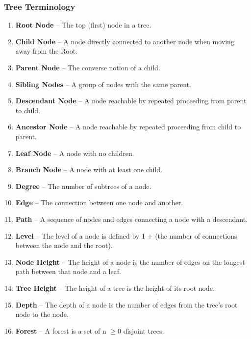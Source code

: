 \documentclass[10pt,a4paper,leqno,bibliography=totoc]{scrartcl}
\newenvironment{alphafootnotes}
{\par\edef\savedfootnotenumber{\number\value{footnote}}
\renewcommand{\thefootnote}{\alph{footnote}}
\setcounter{footnote}{0}}
{\par\setcounter{footnote}{\savedfootnotenumber}}
\begin{document}
\begin{alphafootnotes}
\begin{multicols*}{2}
		\subsubsection{Tree Terminology\supercite{wiki:xxx}}
		\begin{enumerate}[label=\textbf{\alph*})]
			\item \textbf{Root Node} --  The top (first) node in a tree.
			\item \textbf{Child Node} --  A node directly connected to another node when moving away from the Root.
			\item \textbf{Parent Node} --  The converse notion of a child.
			\item \textbf{Sibling Nodes} --  A group of nodes with the same parent.
			\item \textbf{Descendant Node} --  A node reachable by repeated proceeding from parent to child.
			\item \textbf{Ancestor Node} --  A node reachable by repeated proceeding from child to parent.
			\item \textbf{Leaf Node} --  A node with no children.
			\item \textbf{Branch Node} --  A node with at least one child.
			\item \textbf{Degree} --  The number of subtrees of a node.
			\item \textbf{Edge} --  The connection between one node and another.
			\item \textbf{Path} --  A sequence of nodes and edges connecting a node with a descendant.
			\item \textbf{Level} --  The level of a node is defined by 1 + (the number of connections between the node and the root).
			\item \textbf{Node Height} --  The height of a node is the number of edges on the longest path between that node and a leaf.
			\item \textbf{Tree Height} --  The height of a tree is the height of its root node.
			\item \textbf{Depth} --  The depth of a node is the number of edges from the tree's root node to the node.
			\item \textbf{Forest} -- A forest is a set of n $\geq  0$ disjoint trees.
		\end{enumerate}


\end{multicols*}
\end{alphafootnotes}
\end{document}
